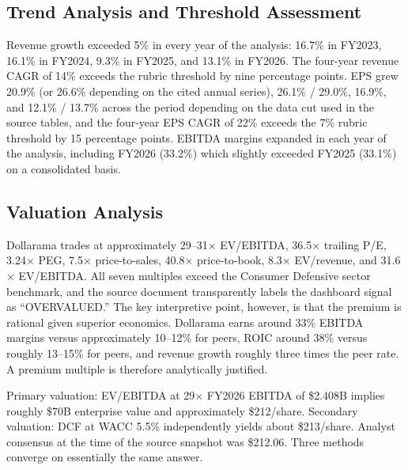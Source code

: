 \documentclass[11pt]{article}
\begin{document}
\subsection{Trend Analysis and Threshold Assessment}
Revenue growth exceeded 5\% in every year of the analysis: 16.7\% in FY2023, 16.1\% in FY2024, 9.3\% in FY2025, and 13.1\% in FY2026. The four-year revenue CAGR of 14\% exceeds the rubric threshold by nine percentage points. EPS grew 20.9\% (or 26.6\% depending on the cited annual series), 26.1\% / 29.0\%, 16.9\%, and 12.1\% / 13.7\% across the period depending on the data cut used in the source tables, and the four-year EPS CAGR of 22\% exceeds the 7\% rubric threshold by 15 percentage points. EBITDA margins expanded in each year of the analysis, including FY2026 (33.2\%) which slightly exceeded FY2025 (33.1\%) on a consolidated basis.

\subsection{Valuation Analysis}
Dollarama trades at approximately 29--31$\times$ EV/EBITDA, 36.5$\times$ trailing P/E, 3.24$\times$ PEG, 7.5$\times$ price-to-sales, 40.8$\times$ price-to-book, 8.3$\times$ EV/revenue, and 31.6$\times$ EV/EBITDA. All seven multiples exceed the Consumer Defensive sector benchmark, and the source document transparently labels the dashboard signal as ``OVERVALUED.'' The key interpretive point, however, is that the premium is rational given superior economics. Dollarama earns around 33\% EBITDA margins versus approximately 10--12\% for peers, ROIC around 38\% versus roughly 13--15\% for peers, and revenue growth roughly three times the peer rate. A premium multiple is therefore analytically justified.

Primary valuation: EV/EBITDA at 29$\times$ FY2026 EBITDA of \$2.408B implies roughly \$70B enterprise value and approximately \$212/share. Secondary valuation: DCF at WACC 5.5\% independently yields about \$213/share. Analyst consensus at the time of the source snapshot was \$212.06. Three methods converge on essentially the same answer.
\end{document}
